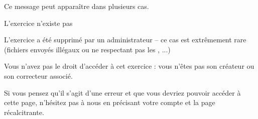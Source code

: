 ﻿Ce message peut apparaître dans plusieurs cas.
\item L'exercice n'existe pas
\item L'exercice a été supprimé par un administrateur -- ce cas est extrêmement rare (fichiers envoyés illégaux ou ne respectant pas les , ...)
\item Vous n'avez pas le droit d'accéder à cet exercice : vous n'êtes pas son créateur ou son correcteur associé.

Si vous pensez qu'il s'agit d'une erreur et que vous devriez pouvoir accéder à cette page, n'hésitez pas à nous  en précisant votre compte et la page récalcitrante.